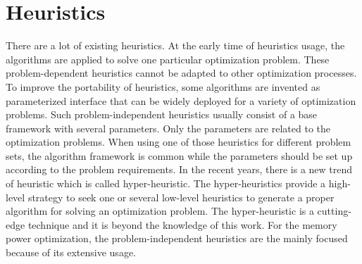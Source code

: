 	
	\section{Heuristics}
	\label{sec:heuristics}
	There are a lot of existing heuristics. At the early time of heuristics usage, the algorithms are applied to solve one
	particular optimization problem. These problem-dependent heuristics cannot be adapted to other optimization processes.
	To improve the portability of heuristics, some algorithms are invented as parameterized interface that can be widely
	deployed for a variety of optimization problems. Such problem-independent heuristics usually consist of a base framework
	with several parameters. Only the parameters are related to the optimization problems. When using one of those
	heuristics for different problem sets, the algorithm framework is common while the parameters should be set up according
	to the problem requirements. In the recent years, there is a new trend of heuristic which is called hyper-heuristic.
	The hyper-heuristics provide a high-level strategy to seek one or several low-level heuristics to generate a proper algorithm for solving an optimization problem. The hyper-heuristic is a cutting-edge technique and it is beyond the knowledge of this work. For the memory power optimization, the problem-independent heuristics are the mainly focused
	because of its extensive usage.
	
